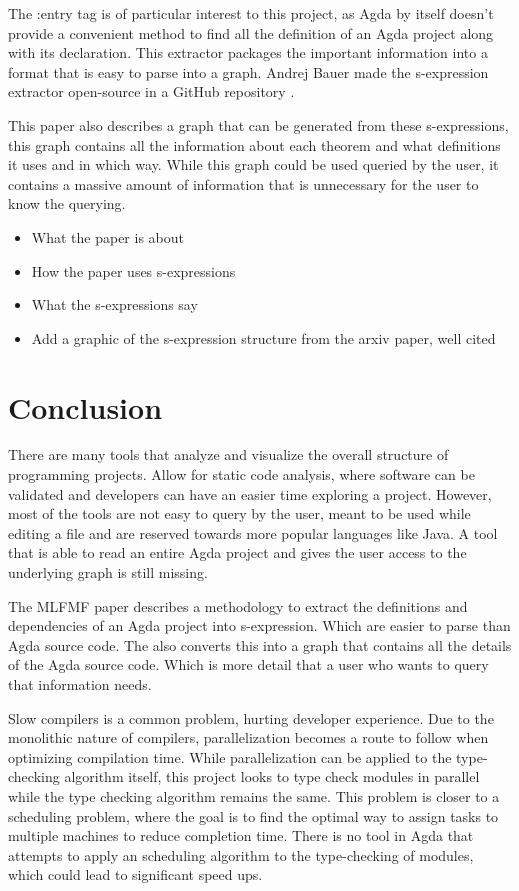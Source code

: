 The :entry tag is of particular interest to this project, as Agda by itself
doesn't provide a convenient method to find all the definition of an Agda
project along with its declaration. This extractor packages the important
information into a format that is easy to parse into a graph. Andrej Bauer made
the s-expression extractor open-source in a GitHub repository \cite{andrej}.

This paper also describes a graph that can be generated from these
s-expressions, this graph contains all the information about each theorem and
what definitions it uses and in which way. While this graph could be used
queried by the user, it contains a massive amount of information that is
unnecessary for the user to know the querying.

\begin{itemize}
\item What the paper is about 
\item How the paper uses s-expressions 
\item What the s-expressions say 
\item Add a graphic of the s-expression structure from the arxiv paper, well cited
\end{itemize}

\section{Conclusion}

There are many tools that analyze and visualize the overall structure of
programming projects. Allow for static code analysis, where software can be
validated and developers can have an easier time exploring a project. However,
most of the tools are not easy to query by the user, meant to be used while
editing a file and are reserved towards more popular languages like Java. A
tool that is able to read an entire Agda project and gives the user access to
the underlying graph is still missing.

The MLFMF paper \cite{bauer2023mlfmf} describes a methodology to extract the
definitions and dependencies of an Agda project into s-expression. Which are
easier to parse than Agda source code. The also converts this into a graph that
contains all the details of the Agda source code. Which is more detail that a
user who wants to query that information needs.

Slow compilers is a common problem, hurting developer experience. Due to the
monolithic nature of compilers, parallelization becomes a route to follow when
optimizing compilation time. While parallelization can be applied to the
type-checking algorithm itself, this project looks to type check modules in
parallel while the type checking algorithm remains the same. This problem is
closer to a scheduling problem, where the goal is to find the optimal way to
assign tasks to multiple machines to reduce completion time. There is no tool
in Agda that attempts to apply an scheduling algorithm to the type-checking of
modules, which could lead to significant speed ups.  


